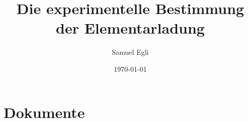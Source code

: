 \documentclass[a4paper,11pt]{report}
\title{Die experimentelle Bestimmung der Elementarladung}
\date{\today}
\author{Samuel Egli}
\begin{document}
	
	
	
	\onehalfspacing	
	
	
	\tableofcontents %
	\newpage %
	
	\renewcommand{\chaptermark}[1]{\markboth{\MakeUppercase{\thechapter.\ #1}}{}} %
	\renewcommand{\sectionmark}[1]{\markright{\thesection.\ #1}{}} %
	\fancyhead[R]{\rightmark}
	\fancyhead[L]{\leftmark}
	\fancyhead[L]{\leftmark}
	\fancyhead[R]{\rightmark}
	\fancyfoot[C]{\thepage{}}
	\pagestyle{fancy}
	
	
	
	
	
	
	
	
	
	
	
	
	
	\cleardoublepage
	\listoffigures
	\nocite{github_repo}
	\printbibliography
	
	
	\appendix
	\newpage
	\chapter{Dokumente}
	
	
	
	
\end{document}
